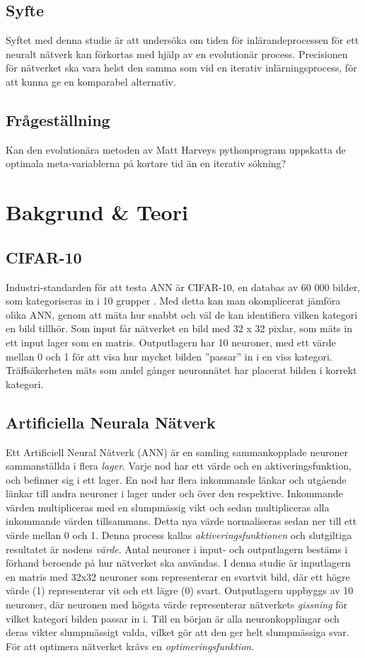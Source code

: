 \documentclass[a4paper, 12pt]{article}
\begin{document}
    \subsection{Syfte}
    Syftet med denna studie är att undersöka om tiden för inlärandeprocessen för ett neuralt nätverk kan förkortas med hjälp av en evolutionär process. Precisionen för nätverket ska vara helst den samma som vid en iterativ inlärningsprocess, för att kunna ge en komparabel alternativ.
    \subsection{Frågeställning}
    Kan den evolutionära metoden av Matt Harveys pythonprogram uppskatta de optimala meta-variablerna på kortare tid än en iterativ sökning?

  \section{Bakgrund \& Teori}
    \subsection{CIFAR-10}
    Industri-standarden för att testa ANN är CIFAR-10, en databas av 60 000 bilder, som kategoriseras in i 10 grupper \cite{krizhevsky2014cifar}. Med detta kan man okomplicerat jämföra olika ANN, genom att mäta hur snabbt och väl de kan identifiera vilken kategori en bild tillhör. Som input får nätverket en bild med 32 x 32 pixlar, som mäts in ett input lager som en matris. Outputlagern har 10 neuroner, med ett värde mellan 0 och 1 för att visa hur mycket bilden ”passar” in i en viss kategori. Träffsäkerheten mäts som andel gånger neuronnätet har placerat bilden i korrekt kategori.

    \subsection{Artificiella Neurala Nätverk}
    Ett Artificiell Neural Nätverk (ANN) \parencite{hopfield1988artificial} är en samling sammankopplade neuroner sammanställda i flera \textit{lager}. Varje nod har ett värde och en aktiveringsfunktion, och befinner sig i ett lager. En nod har flera inkommande länkar och utgående länkar till andra neuroner i lager under och över den respektive. Inkommande värden multipliceras med en slumpmässig vikt och sedan multipliceras alla inkommande värden tillsammans. Detta nya värde normaliseras sedan ner till ett värde mellan 0 och 1. Denna process kallas \textit{aktiveringsfunktionen} och slutgiltiga resultatet är nodens \textit{värde}. Antal neuroner i input- och outputlagern bestäms i förhand beroende på hur nätverket ska användas. I denna studie är inputlagern en matris med 32x32 neuroner som representerar en svartvit bild, där ett högre värde (1) representerar vit och ett lägre (0) svart. Outputlagern uppbyggs av 10 neuroner, där neuronen med högsta värde representerar nätverkets \textit{gissning} för vilket kategori bilden passar in i. Till en början är alla neuronkopplingar och deras vikter slumpmässigt valda, vilket gör att den ger helt slumpmässiga svar. För att optimera nätverket krävs en \textit{optimeringsfunktion}.
\end{document}
